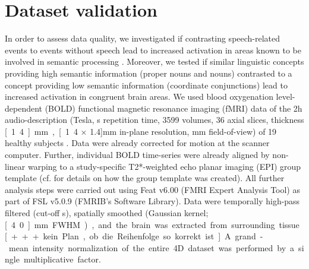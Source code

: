 \documentclass[10pt,a4paper,onecolumn]{article}
\begin{document}
\section*{Dataset validation}
In order to assess data quality, we investigated if contrasting speech-related events to events without speech lead to increased activation in areas known to be involved in semantic processing \citep{hickok2007cortical}.
Moreover, we tested if similar linguistic concepts providing high semantic information (proper nouns and nouns) contrasted to a concept providing low semantic information (coordinate conjunctions) lead to increased activation in congruent brain areas.
We used blood oxygenation level-dependent (BOLD) functional magnetic resonance imaging (fMRI) data of the 2h audio-description (\unit[7]{Tesla}, \unit[2]{s} repetition time, 3599 volumes, 36 axial slices, thickness \unit[1.4]{mm}, \unit[1.4 $\times$ 1.4]{mm} in-plane resolution, \unit[224]{mm} field-of-view) of 19 healthy subjects \citep{hanke2014audiomovie}.
Data were already corrected for motion at the scanner computer.
Further, individual BOLD time-series were already aligned by non-linear warping to a study-specific T2*-weighted echo planar imaging (EPI) group template (cf. \citep{hanke2014audiomovie} for details on how the group template was created).
All further analysis steps were carried out using Feat v6.00 (FMRI Expert Analysis Tool)\citep{woolrich2001autocorr} as part of FSL v5.0.9 (FMRIB's Software Library)\citep{smith2004fsl}.
Data were temporally high-pass filtered (cut-off \unit[150]{s}), spatially smoothed (Gaussian kernel; \unit[4.0]{mm} FWHM), and the brain was extracted from surrounding tissue [+++kein Plan, ob die Reihenfolge so korrekt ist].
A grand-mean intensity normalization of the entire 4D dataset was performed by a single multiplicative factor.
\end{document}
